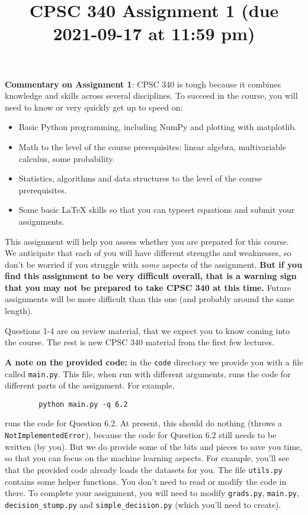 \documentclass{article}
\begin{document}
	\title{CPSC 340 Assignment 1 (due 2021-09-17 at 11:59 pm)}

	\date{}
	\maketitle


	\textbf{Commentary on Assignment 1}: CPSC 340 is tough because it combines knowledge and skills across several disciplines. To succeed
	in the course, you will need to know or very quickly get up to speed on:
	\begin{itemize}
		\item Basic Python programming, including NumPy and plotting with matplotlib.
		\item Math to the level of the course prerequisites: linear algebra, multivariable calculus, some probability.
		\item Statistics, algorithms and data structures to the level of the course prerequisites.
		\item Some basic LaTeX skills so that you can typeset equations and submit your assignments.
	\end{itemize}

	This assignment will help you assess whether you are prepared for this course. We anticipate that each
	of you will have different strengths and weaknesses, so don't be worried if you struggle with \emph{some} aspects
	of the assignment. \textbf{But if you find this assignment
		to be very difficult overall, that is a warning sign that you may not be prepared to take CPSC 340
		at this time.} Future assignments will be more difficult than this one (and probably around the same length).

	Questions 1-4 are on review material, that we expect you to know coming into the course. The rest is new CPSC 340 material from the first few lectures.

	\textbf{A note on the provided code:} in the \texttt{code} directory we provide you with a file called
	\texttt{main.py}. This file, when run with different arguments, runs the code for different
	parts of the assignment. For example,
	\begin{verbatim}
		python main.py -q 6.2
	\end{verbatim}
	runs the code for Question 6.2. At present, this should do nothing (throws a \texttt{NotImplementedError}), because the code
	for Question 6.2 still needs to be written (by you). But we do provide some of the bits
	and pieces to save you time, so that you can focus on the machine learning aspects.
	For example, you'll see that the provided code already loads the datasets for you.
	The file \texttt{utils.py} contains some helper functions.
	You don't need to read or modify the code in there.
	To complete your assignment, you will need to modify \texttt{grads.py}, \texttt{main.py}, \texttt{decision\string_stump.py} and \texttt{simple\string_decision.py} (which you'll need to create).
\end{document}
